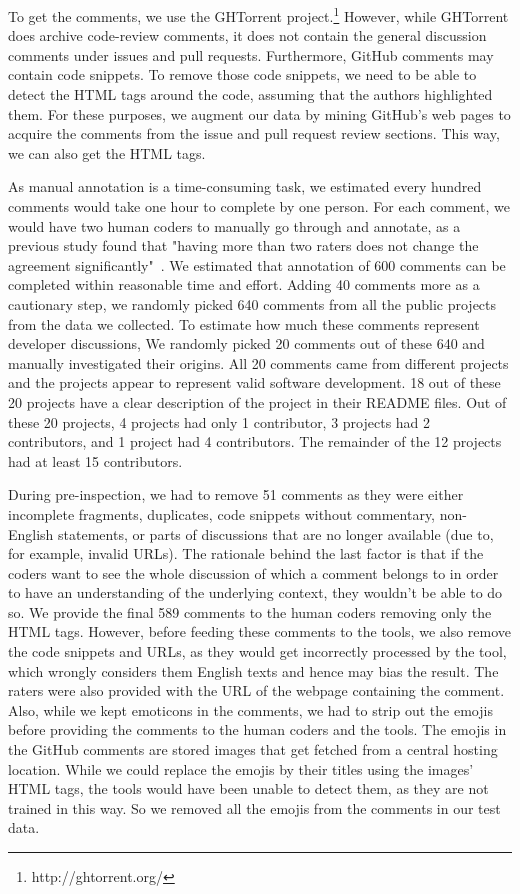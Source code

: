 To get the comments, 
we use the GHTorrent project.\footnote{http://ghtorrent.org/} 
However, while GHTorrent does archive code-review comments, 
it does not contain the general discussion comments 
under issues and pull requests. 
Furthermore, 
GitHub comments may contain code snippets.
To remove those code snippets, 
we need to be able to detect the HTML tags around the code, 
assuming that the authors highlighted them. 
For these purposes, 
we augment our data by mining GitHub's web pages 
to acquire the comments from the issue and pull request review sections. 
This way, we can also get the HTML tags.

As manual annotation is a time-consuming task, 
we estimated 
every hundred comments 
would take one hour to complete by one person. 
For each comment, 
we would have two human coders to 
manually go through and annotate, 
as a previous study found that 
"having more than two raters 
does not change 
the agreement significantly"~\cite{murgia2014developers}. 
We estimated that annotation of 600 comments 
can be completed within reasonable time and effort.
Adding 40 comments more as a cautionary step, 
we randomly picked 640 comments 
from all the public projects from the data we collected.
To estimate how much these comments
represent developer discussions,
We randomly picked 
20 comments out of these 640 
and manually investigated their origins.
All 20 comments came from different projects 
and the projects appear to represent valid software development.
18 out of these 20 projects have a clear description 
of the project in their README files.
Out of these 20 projects, 
4 projects had only 1 contributor, 
3 projects had 2 contributors, 
and 1 project had 4 contributors.
The remainder of the 12 projects had at least 15 contributors.

During pre-inspection, 
we had to remove 51 comments as they were 
either incomplete fragments, 
duplicates, 
code snippets without commentary, 
non-English statements, 
or parts of discussions that are no longer available 
(due to, for example, invalid URLs). 
The rationale behind the last factor is that 
if the coders want to see the whole discussion 
of which a comment belongs to
in order to have an understanding 
of the underlying context, 
they wouldn't be able to do so. 
We provide the final 589 comments to the human coders 
removing only the HTML tags. 
However, before feeding these comments to the tools, 
we also remove the code snippets and URLs, 
as they would get incorrectly processed by the tool,
which
wrongly considers them English texts 
and hence may bias the result. 
The raters were also provided with the URL of the webpage 
containing the comment.
Also, while we kept emoticons in the comments, 
we had to strip out the emojis 
before providing the comments 
to the human coders and the tools.
The emojis in the GitHub comments 
are stored images 
that get fetched from a central hosting location.
While we could replace the emojis 
by their titles using the images' HTML tags, 
the tools would have been unable to detect them, 
as they are not trained in this way.
So we removed all the emojis 
from the comments in our test data.

